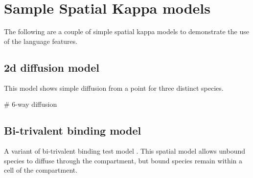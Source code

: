 \newpage
\section{Sample Spatial Kappa models}

The following are a couple of simple spatial kappa models to demonstrate the use of the language features.



\subsection{2d diffusion model}
\label{sec:2dDiffusion}

This model shows simple diffusion from a point for three distinct species.


\begin{kappasource}


# 6-way diffusion



\end{kappasource}


\subsection{Bi-trivalent binding model}
\label{sec:bitrivalent}


A variant of bi-trivalent binding test model \citep{yang2008kinetic}. This spatial model allows unbound species to diffuse through the compartment, but bound species remain within a cell of the compartment.


